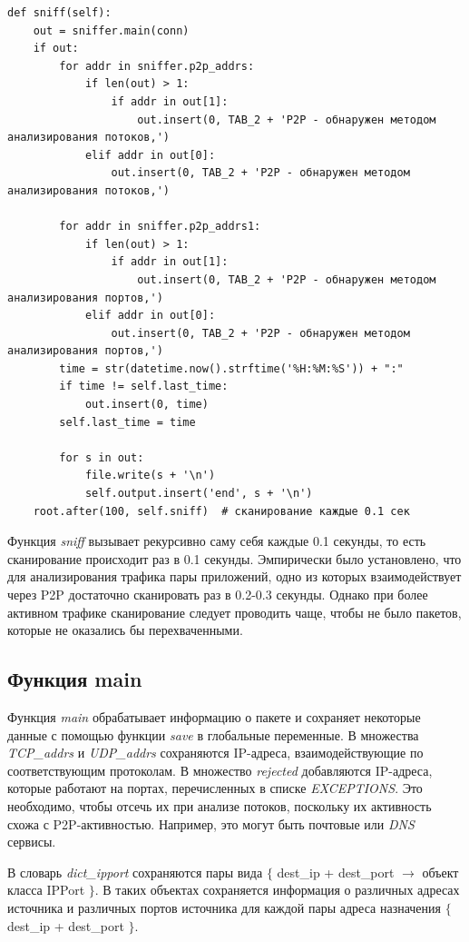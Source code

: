 \documentclass[bachelor, och, coursework]{SCWorks}
\begin{document}
\begin{verbatim}
def sniff(self):
    out = sniffer.main(conn)
    if out:
        for addr in sniffer.p2p_addrs:
            if len(out) > 1:
                if addr in out[1]:
                    out.insert(0, TAB_2 + 'P2P - обнаружен методом анализирования потоков,')
            elif addr in out[0]:
                out.insert(0, TAB_2 + 'P2P - обнаружен методом анализирования потоков,')

        for addr in sniffer.p2p_addrs1:
            if len(out) > 1:
                if addr in out[1]:
                    out.insert(0, TAB_2 + 'P2P - обнаружен методом анализирования портов,')
            elif addr in out[0]:
                out.insert(0, TAB_2 + 'P2P - обнаружен методом анализирования портов,')
        time = str(datetime.now().strftime('%H:%M:%S')) + ":"
        if time != self.last_time:
            out.insert(0, time)
        self.last_time = time

        for s in out:
            file.write(s + '\n')
            self.output.insert('end', s + '\n')
    root.after(100, self.sniff)  # сканирование каждые 0.1 сек
\end{verbatim}

Функция \textit{sniff} вызывает рекурсивно саму себя каждые 0.1 секунды, то есть сканирование происходит раз в 0.1 секунды.
Эмпирически было установлено, что для анализирования трафика пары приложений, одно из которых взаимодействует через P2P достаточно сканировать раз в 0.2-0.3 секунды. Однако при более активном трафике сканирование следует проводить чаще, чтобы не было пакетов, которые не оказались бы перехваченными.

\subsection{Функция main}
Функция \textit{main} обрабатывает информацию о пакете и сохраняет некоторые данные с помощью функции \textit{save} в глобальные переменные.
В множества \textit{TCP_addrs} и \textit{UDP_addrs} сохраняются IP-адреса, взаимодействующие по соответствующим протоколам.
В множество \textit{rejected} добавляются IP-адреса, которые работают на портах, перечисленных в списке \textit{EXCEPTIONS}. 
Это необходимо, чтобы отсечь их при анализе потоков, поскольку их активность схожа с P2P-активностью. Например, это могут быть 
почтовые или \textit{DNS} сервисы.

В словарь \textit{dict_ipport} сохраняются пары вида $\{$ dest_ip + dest_port $\to$ объект класса IPPort $\}$. 
В таких объектах сохраняется информация о различных адресах источника и различных портов источника для каждой пары адреса назначения
$\{$ dest_ip + dest_port $\}$.
\end{document}
